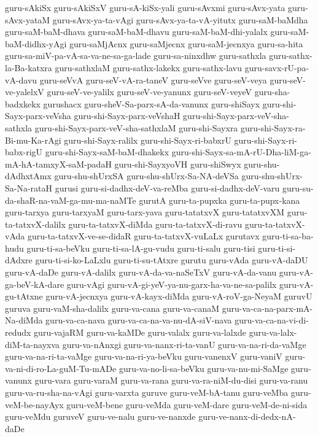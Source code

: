 {guru-sAkiSx
guru-sAkiSxV
guru-sA-kiSx-yali
guru-sAvxmi
guru-sAvx-yata
guru-sAvx-yataM
guru-sAvx-ya-ta-vAgi
guru-sAvx-ya-ta-vA-yitutx
guru-saM-baMdha
guru-saM-baM-dhava
guru-saM-baM-dhavu
guru-saM-baM-dhi-yalalx
guru-saM-baM-didhx-yAgi
guru-saMjAcnx
guru-saMjecnx
guru-saM-jecnxya
guru-sa-hita
guru-sa-miV-pa-vA-sa-va-ne-sa-ga-lade
guru-sa-ninxdhw
guru-sathxla
guru-sathx-la-Ba-katxra
guru-sathxlaM
guru-sathx-lakekx
guru-sathx-lavu
guru-savx-rU-pa-vA-davu
guru-seVvA
guru-seV-vA-ra-taneV
guru-seVve
guru-seV-veya
guru-seV-ve-yalelxV
guru-seV-ve-yalilx
guru-seV-ve-yanunx
guru-seV-veyeV
guru-sha-badxkekx
gurushacx
guru-sheV-Sa-parx-sA-da-vanunx
guru-shiSayx
guru-shi-Sayx-parx-veVsha
guru-shi-Sayx-parx-veVshaH
guru-shi-Sayx-parx-veV-sha-sathxla
guru-shi-Sayx-parx-veV-sha-sathxlaM
guru-shi-Sayxra
guru-shi-Sayx-ra-Bi-mu-Ka-rAgi
guru-shi-Sayx-ralilx
guru-shi-Sayx-ri-babxrU
guru-shi-Sayx-ri-babx-rigU
guru-shi-Sayx-saM-baM-dhakekx
guru-shi-Sayx-sa-mA-rU-Dha-liM-ga-mA-hA-tamxyX-saM-padaH
guru-shi-SayxyoVH
guru-shiSwyx
guru-shu-dAdhxtAmx
guru-shu-shUrxSA
guru-shu-shUrx-Sa-NA-deVSa
guru-shu-shUrx-Sa-Na-rataH
gurusi
guru-si-dadhx-deV-va-reMba
guru-si-dadhx-deV-varu
guru-su-da-shaR-na-vaM-ga-mu-ma-naMTe
gurutA
guru-ta-pupxka
guru-ta-pupx-kana
guru-tarxya
guru-tarxyaM
guru-tarx-yava
guru-tatatxvX
guru-tatatxvXM
guru-ta-tatxvX-dalilx
guru-ta-tatxvX-diMda
guru-ta-tatxvX-di-ravu
guru-ta-tatxvX-vAda
guru-ta-tatxvX-ve-se-didaR
guru-ta-tatxvX-vuLaLx
gurutavx
guru-ti-sa-ba-hudu
guru-ti-sa-beVku
guru-ti-sa-lA-gu-vudu
guru-ti-salu
guru-tisi
guru-ti-si-dAdxre
guru-ti-si-ko-LaLxlu
guru-ti-su-tAtxre
gurutu
guru-vAda
guru-vA-daDU
guru-vA-daDe
guru-vA-dalilx
guru-vA-da-va-naSeTxV
guru-vA-da-vanu
guru-vA-ga-beV-kA-dare
guru-vAgi
guru-vA-gi-yeV-ya-nu-garx-ha-va-ne-sa-palilx
guru-vA-gu-tAtxne
guru-vA-jecnxya
guru-vA-kayx-diMda
guru-vA-roV-ga-NeyaM
guruvU
guruva
guru-vaM-sha-dalilx
guru-va-cana
guru-va-canaM
guru-va-ca-na-parx-mA-Na-diMda
guru-va-ca-nava
guru-va-ca-na-va-nu-dA-siV-nava
guru-va-ca-na-vi-di-redudx
guru-vajaRM
guru-va-kaMDe
guru-valalx
guru-va-lalxde
guru-va-lalx-diM-ta-nayxva
guru-va-nAnxgi
guru-va-nanx-ri-ta-vanU
guru-va-na-ri-da-vaMge
guru-va-na-ri-ta-vaMge
guru-va-na-ri-ya-beVku
guru-vanenxV
guru-vaniV
guru-va-ni-di-ro-La-guM-Tu-mADe
guru-va-no-li-sa-beVku
guru-va-nu-mi-SaMge
guru-vanunx
guru-vara
guru-varaM
guru-va-rana
guru-va-ra-niM-du-disi
guru-va-ranu
guru-va-ru-sha-na-vAgi
guru-varxta
guruve
guru-veM-bA-tanu
guru-veMba
guru-veM-be-nayAyx
guru-veM-bene
guru-veMda
guru-veM-dare
guru-veM-de-ni-sida
guru-veMdu
guruveV
guru-ve-nalu
guru-ve-nanxde
guru-ve-nanx-di-dedx-nA-daDe
}
